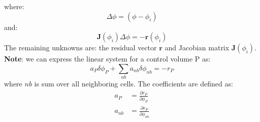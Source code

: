 \documentclass[11pt]{article}
\begin{document}
where:
\begin{equation}
\Delta \phi = (\phi - \phi_i)
\end{equation}
and:
\begin{equation}
\textbf{J}(\phi_i)\Delta \phi = -\textbf{r}(\phi_i)
\end{equation}
The remaining unknowns are: the residual vector \(\textbf{r}\) and Jacobian matrix \(\textbf{J}(\phi_i)\).\\
\textbf{Note}: we can express the linear system for a control volume P as:
\begin{equation}
a_P\delta \phi_P + \sum_{nb} a_{nb}\delta \phi_{nb} = -r_P
\end{equation}
where \(nb\) is sum over all neighboring cells.  The coefficients are defined as:
\begin{align}
a_P &= \frac{\partial r_P}{\partial \phi_P}\\
a_{nb} &= \frac{\partial r_P}{\partial \phi_{nb}}
\end{align}
\end{document}
